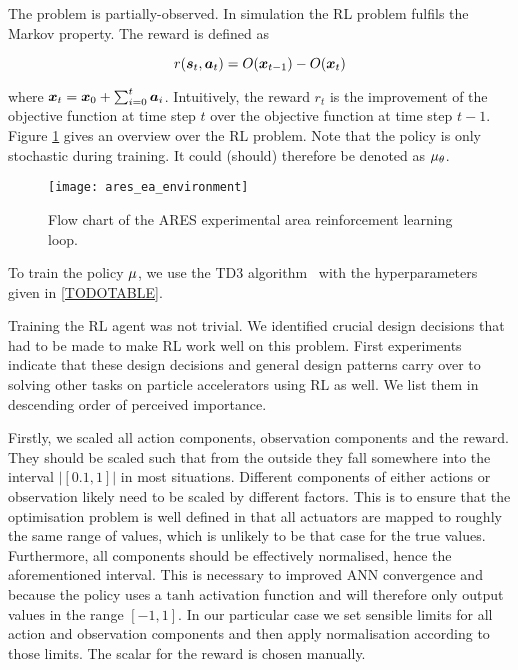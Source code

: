 The problem is partially-observed. In simulation the \ac{RL} problem fulfils the Markov property. The reward is defined as

\begin{equation}
    r(\bm{s}_t, \bm{a}_t) = O(\bm{x}_{t-1}) - O(\bm{x}_t)
\end{equation}

where $\bm{x}_t = \bm{x}_0 + \sum_{i = 0}^t \bm{a}_i$. Intuitively, the reward $r_t$ is the improvement of the objective function at time step $t$ over the objective function at time step $t-1$. Figure \ref{fig:ares_ea_environment} gives an overview over the \ac{RL} problem. Note that the policy is only stochastic during training. It could (should) therefore be denoted as $\mu_\theta$.

\begin{figure}
    \centering
    \texttt{[image: ares\_ea\_environment]}
    \caption{Flow chart of the ARES experimental area reinforcement learning loop.}
    \label{fig:ares_ea_environment}
\end{figure}

To train the policy $\mu$, we use the TD3 algorithm~\cite{TODO} with the hyperparameters given in \cref{TODOTABLE}.

Training the \ac{RL} agent was not trivial. We identified crucial design decisions that had to be made to make \ac{RL} work well on this problem. First experiments indicate that these design decisions and general design patterns carry over to solving other tasks on particle accelerators using \ac{RL} as well. We list them in descending order of perceived importance.

Firstly, we scaled all action components, observation components and the reward. They should be scaled such that from the outside they fall somewhere into the interval $|[0.1,1]|$ in most situations. Different components of either actions or observation likely need to be scaled by different factors. This is to ensure that the optimisation problem is well defined in that all actuators are mapped to roughly the same range of values, which is unlikely to be that case for the true values. Furthermore, all components should be effectively normalised, hence the aforementioned interval. This is necessary to improved \ac{ANN} convergence and because the policy uses a $\text{tanh}$ activation function and will therefore only output values in the range $[-1,1]$. In our particular case we set sensible limits for all action and observation components and then apply normalisation according to those limits. The scalar for the reward is chosen manually.


